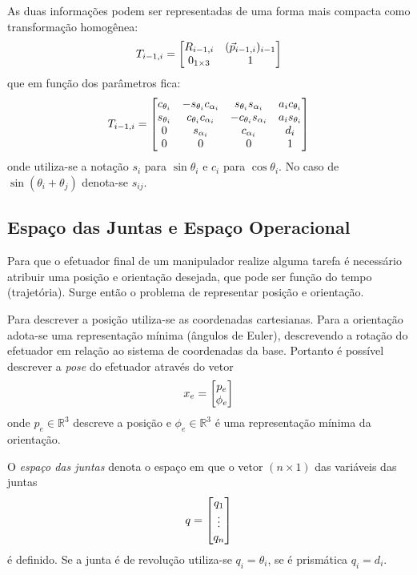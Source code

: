As duas informações podem ser representadas de uma forma mais compacta como transformação homogênea:
\begin{equation}
T_{i-1,i} = \begin{bmatrix}
    R_{i-1,i}       &  ({\vec{p}}_{i-1,i})_{i-1} \\
    0_{1 \times 3}  &                             1
\end{bmatrix}
\end{equation}
que em função dos parâmetros fica:
\begin{equation} \label{eq:transform_dh}
T_{i-1,i} = \begin{bmatrix}
    c_{\theta_i}  & -s_{\theta_i}c_{\alpha_i}   &   s_{\theta_i}s_{\alpha_i}  & a_i c_{\theta_i} \\ 
    s_{\theta_i}  & c_{\theta_i}c_{\alpha_i}    &  -c_{\theta_i}s_{\alpha_i}  & a_i s_{\theta_i} \\
    0             & s_{\alpha_i}                &   c_{\alpha_i}              & d_i              \\
    0             & 0                           &   0                         & 1
\end{bmatrix}
\end{equation}
onde utiliza-se a notação $s_i$ para $\sin \theta_i$ e $c_i$ para $\cos \theta_i$. No caso de  $\sin (\theta_i + \theta_j)$ denota-se $s_{ij}$.

\subsection{Espaço das Juntas e Espaço Operacional}
Para que o efetuador final de um manipulador realize alguma tarefa é necessário atribuir uma posição e orientação desejada, que  pode ser função do tempo (trajetória). Surge então o problema de representar posição e orientação. 

Para descrever a posição utiliza-se as coordenadas cartesianas. Para a orientação adota-se uma representação mínima (ângulos de Euler), descrevendo a rotação do efetuador em relação ao sistema de coordenadas da base. Portanto é possível descrever a \textit{pose} do efetuador através do vetor
\begin{equation} \label{eq:op_space}
{x}_e = \begin{bmatrix} {p}_e \\ {\phi}_e\end{bmatrix}
\end{equation}
onde ${p}_e \in \mathbb{R}^3$ descreve a posição e ${\phi}_e \in \mathbb{R}^3$ é uma representação mínima da orientação.

O \textit{espaço das juntas} denota o espaço em que o vetor $(n \times 1)$ das variáveis das juntas
\begin{equation} \label{eq:joint_space}
{q} = \begin{bmatrix}q_1 \\ \vdots \\ q_n\end{bmatrix}
\end{equation} 
é definido. Se a junta é de revolução utiliza-se $q_i = \theta_i$, se é prismática $q_i = d_i$.

